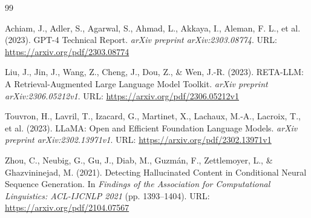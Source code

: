 \documentclass{article}
\begin{document}

\begin{thebibliography}{99}

Achiam, J., Adler, S., Agarwal, S., Ahmad, L., Akkaya, I., Aleman, F. L., et al. (2023). GPT-4 Technical Report. \textit{arXiv preprint arXiv:2303.08774}. URL: \url{https://arxiv.org/pdf/2303.08774}

Liu, J., Jin, J., Wang, Z., Cheng, J., Dou, Z., \& Wen, J.-R. (2023). RETA-LLM: A Retrieval-Augmented Large Language Model Toolkit. \textit{arXiv preprint arXiv:2306.05212v1}. URL: \url{https://arxiv.org/pdf/2306.05212v1}

Touvron, H., Lavril, T., Izacard, G., Martinet, X., Lachaux, M.-A., Lacroix, T., et al. (2023). LLaMA: Open and Efficient Foundation Language Models. \textit{arXiv preprint arXiv:2302.13971v1}. URL: \url{https://arxiv.org/pdf/2302.13971v1}

Zhou, C., Neubig, G., Gu, J., Diab, M., Guzmán, F., Zettlemoyer, L., \& Ghazvininejad, M. (2021). Detecting Hallucinated Content in Conditional Neural Sequence Generation. In \textit{Findings of the Association for Computational Linguistics: ACL-IJCNLP 2021} (pp. 1393--1404). URL: \url{https://arxiv.org/pdf/2104.07567}

\end{thebibliography}
\end{document}
